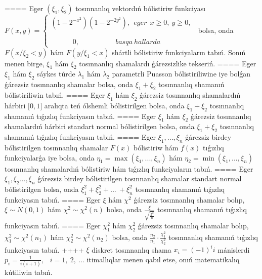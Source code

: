 ====
Eger \(\left( \xi_{1},\xi_{2} \right)\) tosınnanlıq vektordıń bólistiriw funkciyası \(F(x,y) = \left\{ \begin{matrix}
\left( 1 - 2^{- x^{2}} \right)\left( 1 - 2^{- 2y^{2}} \right),\ \ eger\ \ x \geq 0,\ y \geq 0, \\
 \\
 \\
\ \ \ \ \ \ \ \ \ \ \ \ \ \ 0,\ \ \ \ \ \ \ \ \ \ \ \ \ \ \ \ \ \ \ \ \ \ \ basqa\ hallarda
\end{matrix} \right.\ \) bolsa, onda \(F\left( x/\xi_{2} < y \right)\) hám \(F\left( y/\xi_{1} < x \right)\) shártli bólistiriw funkciyaların tabıń. Sonıń menen birge, \(\xi_{1}\) hám \(\xi_{2}\) tosınnanlıq shamalardı ǵárezsizlike tekseriń.
====
Eger \(\xi_{1}\) hám \(\xi_{2}\) sáykes túrde \(\lambda_{1}\) hám \(\lambda_{2}\) parametrli Puasson bólistiriliwine iye bolǵan ǵárezsiz tosınnanlıq shamalar bolsa, onda \(\xi_{1} + \xi_{2}\) tosınnanlıq shamanıń bólistiriliwin tabıń.
====
Eger \(\xi_{1}\) hám \(\xi_{2}\) ǵárezsiz tosınnanlıq shamalardıń hárbiri \(\lbrack 0,1\rbrack\) aralıqta teń ólshemli bólistirilgen bolsa, onda \(\xi_{1} + \xi_{2}\) tosınnanlıq shamanıń tıǵızlıq funkciyasın tabıń.
====
Eger \(\xi_{1}\) hám \(\xi_{2}\) ǵárezsiz tosınnanlıq shamalardıń hárbiri standart normal bólistirilgen bolsa, onda \(\xi_{1} + \xi_{2}\) tosınnanlıq shamanıń tıǵızlıq funkciyasın tabıń.
====
Eger \(\xi_{1},...,\xi_{n}\) ǵárezsiz birdey bólistirilgen tosınnanlıq shamalar \(F(x)\) bólistiriw hám \(f(x)\) tıǵızlıq funkciyalarǵa iye bolsa, onda \(\eta_{1} = \max\left( \xi_{1},...,\xi_{n} \right)\) hám \(\eta_{2} = \min\left( \xi_{1},...,\xi_{n} \right)\) tosınnanlıq shamalardıń bólistiriw hám tıǵızlıq funkciyaların tabıń.
====
Eger \(\xi_{1},\xi_{2}...,\xi_{n}\) ǵárezsiz birdey bólistirilgen tosınnanlıq shamalar standart normal bólistirilgen bolsa, onda \(\xi_{1}^{2} + \xi_{2}^{2} + ...\  + \xi_{n}^{2}\) tosınnanlıq shamanıń tıǵızlıq funkciyasın tabıń.
====
Eger \(\xi\) hám \(\chi^{2}\) ǵárezsiz tosınnanlıq shamalar bolıp, \(\xi\sim N(0,1)\) hám \(\chi^{2}\sim\chi^{2}(n)\) bolsa, onda \(\frac{\xi}{\sqrt{\frac{\chi^{2}}{n}}}\) tosınnanlıq shamanıń tıǵızlıq funkciyasın tabıń.
====
Eger \(\chi_{1}^{2}\) hám \(\chi_{2}^{2}\) ǵárezsiz tosınnanlıq shamalar bolıp, \(\chi_{1}^{2}\sim\chi^{2}(n_{1})\) hám \(\chi_{2}^{2}\sim\chi^{2}(n_{2})\) bolsa, onda \(\frac{n_{2}}{n_{1}} \cdot \frac{\chi_{1}^{2}}{\chi_{2}^{2}}\) tosınnanlıq shamanıń tıǵızlıq funkciyasın tabıń.
++++
\(\xi\) diskret tosınnanlıq shama \(x_{i} = ( - 1)^{i}i\) mánislerdi \(p_{i} = \frac{1}{i(i + 1)},\) \(\ \ i = 1,\ 2,\ ...\) itimallıqlar menen qabıl etse, onıń matematikalıq kútiliwin tabıń.
